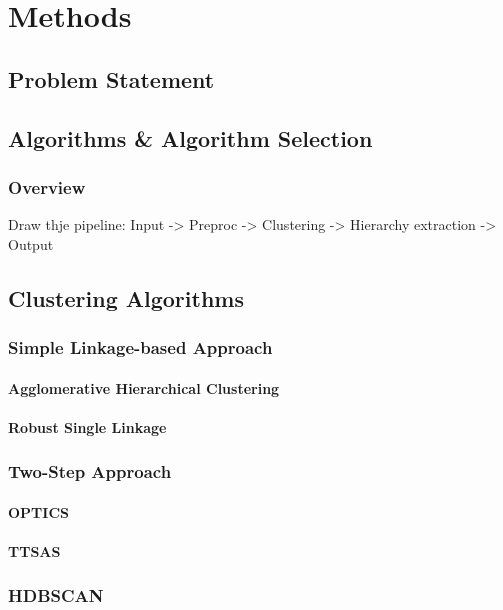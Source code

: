 \chapter{Methods}
\section{Problem Statement}

\section{Algorithms \& Algorithm Selection}
\subsection{Overview}
Draw thje pipeline: 
 Input -> Preproc -> Clustering -> Hierarchy extraction -> Output


\section{Clustering Algorithms}
\subsection{Simple Linkage-based Approach}
\subsubsection{Agglomerative Hierarchical Clustering}
\subsubsection{Robust Single Linkage}

\subsection{Two-Step Approach}
\subsubsection{OPTICS}
\subsubsection{TTSAS}
\subsubsection{}
\subsection{HDBSCAN}

